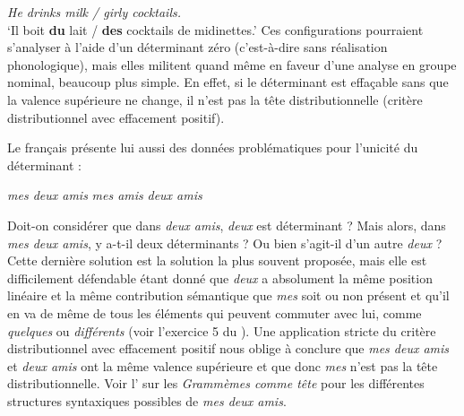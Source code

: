 \ea
\textit{{He drinks milk / girly cocktails.}}\\
\glt ‘Il boit \textbf{du} lait / \textbf{des} cocktails de midinettes.’
\z
Ces configurations pourraient s’analyser à l’aide d’un déterminant zéro (c’est-à-dire sans réalisation phonologique), mais elles militent quand même en faveur d’une analyse en groupe nominal, beaucoup plus simple. En effet, si le déterminant est effaçable sans que la valence supérieure ne change, il n’est pas la tête distributionnelle (critère distributionnel avec effacement positif).

Le français présente lui aussi des données problématiques pour l’unicité du déterminant :

\ea
  \ea \textit{mes deux amis}
  \ex \textit{mes amis}
  \ex \textit{deux amis}
  \z
\z

Doit-on considérer que dans \textit{deux amis}, \textit{deux} est déterminant ? Mais alors, dans \textit{mes deux amis}, y a-t-il deux déterminants ? Ou bien s’agit-il d’un autre \textit{deux} ? Cette dernière solution est la solution la plus souvent proposée, mais elle est difficilement défendable étant donné que \textit{deux} a absolument la même position linéaire et la même contribution sémantique que \textit{mes} soit ou non présent et qu’il en va de même de tous les éléments qui peuvent commuter avec lui, comme \textit{quelques} ou \textit{différents} (voir l’exercice 5 du ). Une application stricte du critère distributionnel avec effacement positif nous oblige à conclure que \textit{mes deux amis} et \textit{deux amis} ont la même valence supérieure et que donc \textit{mes} n’est pas la tête distributionnelle. Voir l’ sur les \textit{Grammèmes comme tête} pour les différentes structures syntaxiques possibles de \textit{mes deux amis}.

